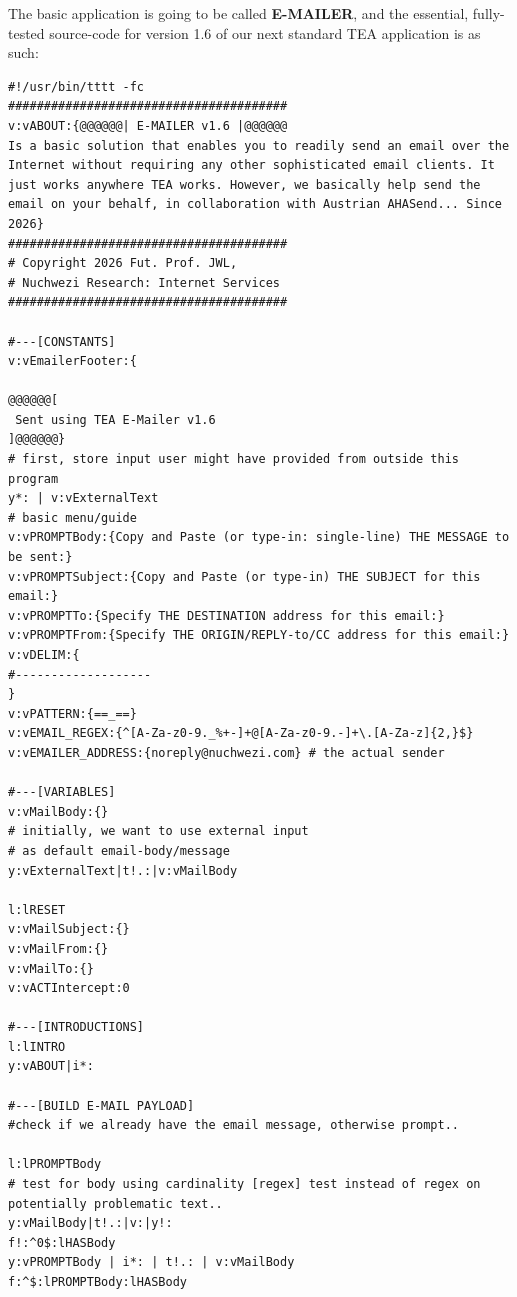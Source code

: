 \documentclass[a4paper, 18pt]{book} %
\begin{document}
{{{The basic application is going to be called \textbf{E-MAILER}, and the essential, fully-tested source-code for version 1.6 of our next standard TEA application is as such:

\vspace{2em}

{
 \Large
  \begin{tcolorbox}[teaterminalstyle, title=TEA Program: E-MAILER v1.6, breakable]
  \begin{lstlisting}[language=TEA,breaklines=true,]
#!/usr/bin/tttt -fc
#######################################
v:vABOUT:{@@@@@@| E-MAILER v1.6 |@@@@@@
Is a basic solution that enables you to readily send an email over the Internet without requiring any other sophisticated email clients. It just works anywhere TEA works. However, we basically help send the email on your behalf, in collaboration with Austrian AHASend... Since 2026}
#######################################
# Copyright 2026 Fut. Prof. JWL, 
# Nuchwezi Research: Internet Services
#######################################

#---[CONSTANTS]
v:vEmailerFooter:{

@@@@@@[
 Sent using TEA E-Mailer v1.6 
]@@@@@@}
# first, store input user might have provided from outside this program
y*: | v:vExternalText
# basic menu/guide
v:vPROMPTBody:{Copy and Paste (or type-in: single-line) THE MESSAGE to be sent:}
v:vPROMPTSubject:{Copy and Paste (or type-in) THE SUBJECT for this email:}
v:vPROMPTTo:{Specify THE DESTINATION address for this email:}
v:vPROMPTFrom:{Specify THE ORIGIN/REPLY-to/CC address for this email:}
v:vDELIM:{
#-------------------
}
v:vPATTERN:{==_==}
v:vEMAIL_REGEX:{^[A-Za-z0-9._%+-]+@[A-Za-z0-9.-]+\.[A-Za-z]{2,}$}
v:vEMAILER_ADDRESS:{noreply@nuchwezi.com} # the actual sender

#---[VARIABLES]
v:vMailBody:{}
# initially, we want to use external input 
# as default email-body/message
y:vExternalText|t!.:|v:vMailBody

l:lRESET
v:vMailSubject:{}
v:vMailFrom:{}
v:vMailTo:{}
v:vACTIntercept:0

#---[INTRODUCTIONS]
l:lINTRO
y:vABOUT|i*:

#---[BUILD E-MAIL PAYLOAD]
#check if we already have the email message, otherwise prompt..

l:lPROMPTBody
# test for body using cardinality [regex] test instead of regex on potentially problematic text..
y:vMailBody|t!.:|v:|y!:
f!:^0$:lHASBody
y:vPROMPTBody | i*: | t!.: | v:vMailBody 
f:^$:lPROMPTBody:lHASBody


\end{lstlisting}
\end{tcolorbox}}}}}
\end{document}
